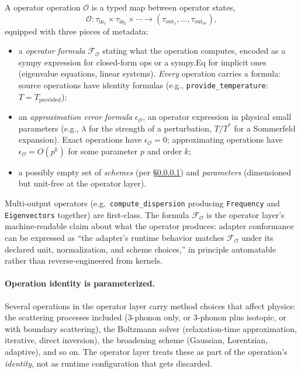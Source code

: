 \documentclass[11pt,a4paper]{article}
\begin{document}
A operator operation $\mathcal{O}$ is a typed map between operator states,
\begin{equation}
  \mathcal{O} : \tau_{\text{in}_1} \times \tau_{\text{in}_2} \times \cdots \to (\tau_{\text{out}_1}, \ldots, \tau_{\text{out}_m}),
\end{equation}
equipped with three pieces of metadata:
\begin{itemize}[leftmargin=2em]
  \item a \emph{operator formula} $\mathcal{F}_\mathcal{O}$ stating what the operation
        computes, encoded as a sympy expression for closed-form ops or a sympy.Eq for
        implicit ones (eigenvalue equations, linear systems). \emph{Every} operation
        carries a formula: source operations have identity formulas (e.g.,
        \texttt{provide\_temperature}: $T = T_{\text{provided}}$);
  \item an \emph{approximation error formula} $\epsilon_{\mathcal{O}}$, an operator
        expression in physical small parameters (e.g., $\lambda$ for the strength of a
        perturbation, $T/T^*$ for a Sommerfeld expansion). Exact operations have
        $\epsilon_{\mathcal{O}} = 0$; approximating operations have
        $\epsilon_{\mathcal{O}} = O(p^k)$ for some parameter $p$ and order $k$;
  \item a possibly empty set of \emph{schemes} (per
        \S\ref{ssec:parameterized-operation-identity}) and \emph{parameters}
        (dimensioned but unit-free at the operator layer).
\end{itemize}
Multi-output operators (e.g.\ \texttt{compute\_dispersion} producing
\texttt{Frequency} and \texttt{Eigenvectors} together) are first-class. The formula
$\mathcal{F}_\mathcal{O}$ is the operator layer's machine-readable claim about what the
operator produces: adapter conformance can be expressed as ``the adapter's runtime
behavior matches $\mathcal{F}_\mathcal{O}$ under its declared unit, normalization,
and scheme choices,'' in principle automatable rather than reverse-engineered
from kernels.


\paragraph{Operation identity is parameterized.}\label{ssec:parameterized-operation-identity}

Several operations in the operator layer carry method choices that affect physics: the scattering
processes included (3-phonon only, or 3-phonon plus isotopic, or with boundary scattering), the
Boltzmann solver (relaxation-time approximation, iterative, direct inversion), the broadening
scheme (Gaussian, Lorentzian, adaptive), and so on. The operator layer treats these as part of the
operation's \emph{identity}, not as runtime configuration that gets discarded.
\end{document}
